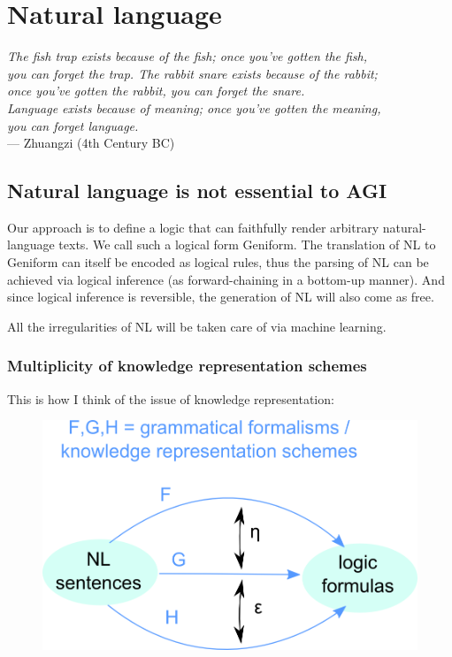 \chapter{Natural language}
\label{ch:natural-language}
\begin{flushright}
\emph{The fish trap exists because of the fish; once you've gotten the fish,\\
you can forget the trap. The rabbit snare exists because of the rabbit;\\
once you've gotten the rabbit, you can forget the snare.\\
Language exists because of meaning; once you've gotten the meaning,\\
you can forget language.}\\ --- Zhuangzi (4th Century BC)
\end{flushright}
\minitoc

\section{Natural language is not essential to AGI}

Our approach is to define a logic that can faithfully render arbitrary natural-language texts.  We call such a logical form Geniform.  The translation of NL to Geniform can itself be encoded as logical rules, thus the parsing of NL can be achieved via logical inference (as forward-chaining in a bottom-up manner).  And since logical inference is reversible, the generation of NL will also come as free.

All the irregularities of NL will be taken care of via machine learning.

\subsection{Multiplicity of knowledge representation schemes}

This is how I think of the issue of knowledge representation:\\
\begin{figure}[H]
\centering
\includegraphics[scale=0.7]{KR-functors.png}
\end{figure}

